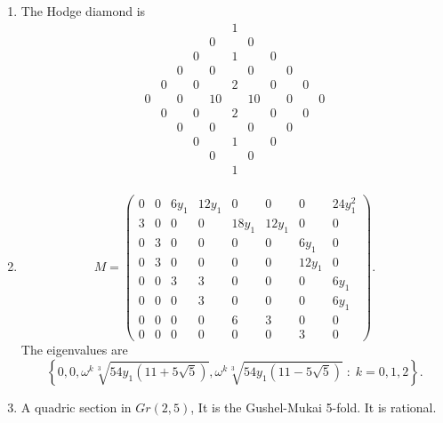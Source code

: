 \documentclass[11pt]{amsart}
\newcounter{num}[section] %
\begin{document}
\begin{enumerate}
    
\item[1)] The Hodge diamond is
\[
\begin{array}{cccccccccccccc}
&& && && 1 && && && \\
&& && & 0 && 0 & && && \\
&& && 0 && 1 && 0 && && \\
&& & 0 && 0 && 0 && 0 && & \\
&& 0 && 0 && 2 && 0 && 0 && \\
& 0 && 0 && 10 && 10 && 0 && 0  \\
&& 0 && 0 && 2 && 0 && 0 && \\
&& & 0 && 0 && 0 && 0 && & \\
&& && 0 && 1 && 0 && && \\
&& && & 0 && 0 & && && \\
&& && && 1 && && && \\
\end{array}
\]
\item[2)]
\[
M=
\begin{pmatrix}
0&0&6y_1&12y_1&0&0&0&24y_1^2\\
3&0&0&0&18y_1&12y_1&0&0\\
0&3&0&0&0&0&6y_1&0\\
0&3&0&0&0&0&12y_1&0\\
0&0&3&3&0&0&0&6y_1\\
0&0&0&3&0&0&0&6y_1\\
0&0&0&0&6&3&0&0\\
0&0&0&0&0&0&3&0
\end{pmatrix}.
\]
The eigenvalues are
\[
\left\{
0,0,
\omega^k\sqrt[3]{54y_1(11+5\sqrt5)},
\omega^k\sqrt[3]{54y_1(11-5\sqrt5)}
\;:\; k=0,1,2
\right\}.
\]
\item[3)] A quadric section in $Gr(2,5)$, It is the Gushel-Mukai 5-fold. It is rational. 
\end{enumerate}
\end{document}
